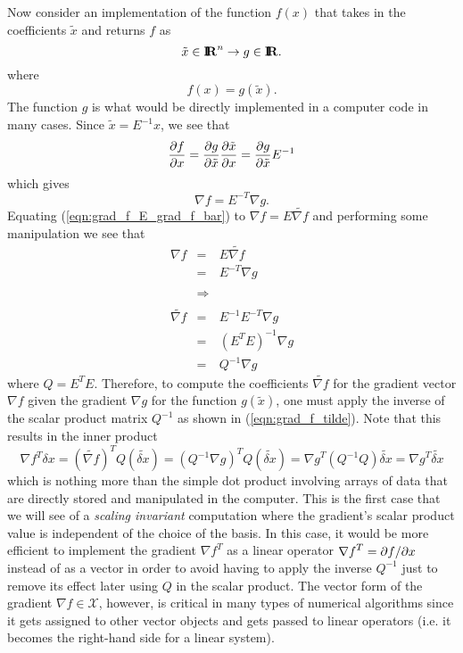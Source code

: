 Now consider an implementation of the function $f(x)$ that takes in the coefficients
$\tilde{x}$ and returns $f$ as
%
\[
\tilde{x}\in\mbox{\textbf{I}}\hspace{-0.6ex}\mbox{\textbf{R}}^n \rightarrow g\in\mbox{\textbf{I}}\hspace{-0.6ex}\mbox{\textbf{R}}.
\]
%
where
%
\[
f(x) = g(\tilde{x}).
\]
%
The function $g$ is what would be directly implemented in a computer code in
many cases.  Since $\tilde{x} = E^{-1} x$, we see that
%
\[
\displaystyle{\frac{\partial f}{\partial x}} = \displaystyle{\frac{\partial g}{\partial \tilde{x}}} \displaystyle{\frac{\partial \tilde{x}}{\partial x}}  = \displaystyle{\frac{\partial g}{\partial \tilde{x}}} E^{-1}
\]
%
which gives
%
\begin{equation}
\nabla f = E^{-T} \nabla g.
\label{eqn:grad_f_E_grad_f_bar}
\end{equation}
%
Equating (\ref{eqn:grad_f_E_grad_f_bar}) to $\nabla f = E {}\tilde{\nabla f}$
and performing some manipulation we see that
%
\begin{eqnarray}
\nabla f
& = & E \tilde{\nabla f} \nonumber \\
& = & E^{-T} \nabla g \nonumber \\
& & \nonumber \\
& \Rightarrow & \nonumber \\
& & \nonumber \\
\tilde{\nabla f}
& = & E^{-1} E^{-T} \nabla g \nonumber \\
& = & (E^T E)^{-1} \nabla g \nonumber \\
& = & {Q}^{-1} \nabla g
\label{eqn:grad_f_tilde}
\end{eqnarray}
%
where $Q = E^T E$.  Therefore, to compute the coefficients
$\tilde{\nabla f}$ for the gradient vector $\nabla f$ given the gradient
$\nabla g$ for the function $g(\tilde{x})$, one must apply the inverse of the
scalar product matrix $Q^{-1}$ as shown in
(\ref{eqn:grad_f_tilde}).  Note that this results in the inner product
%
\[
{\nabla f}^T \delta x = (\tilde{\nabla f})^T Q (\tilde{\delta x})
= ({Q}^{-1} {\nabla g})^T Q (\tilde{\delta x})
= {\nabla g}^T ( {Q}^{-1} Q ) \tilde{\delta x}
= {\nabla g}^T \tilde{\delta x}
\]
%
which is nothing more than the simple dot product involving arrays of data
that are directly stored and manipulated in the computer.  This is the first
case that we will see of a {}\textit{scaling invariant} computation where the
gradient's scalar product value is independent of the choice of the basis.  In
this case, it would be more efficient to implement the gradient ${\nabla f}^T$
as a linear operator ${\nabla f}^T = {}\partial f / \partial x$ instead of as a vector in
order to avoid having to apply the inverse ${Q}^{-1}$ just to remove its
effect later using $Q$ in the scalar product.  The vector form of the gradient
$\nabla f\in\mathcal{X}$, however, is critical in many types of numerical
algorithms since it gets assigned to other vector objects and gets passed to
linear operators (i.e. it becomes the right-hand side for a linear system).

